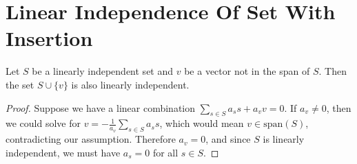 \section{Linear Independence Of Set With Insertion}

\begin{theorem}
  \label{theorem : linear_independent_insert_of_not_in_span}
  \leanok
  Let $S$ be a linearly independent set and $v$ be a vector not in the span of $S$. Then the set $S \cup \{v\}$ is also linearly independent.
\end{theorem}

\begin{proof}
  Suppose we have a linear combination $\sum_{s \in S} a_s s + a_v v = 0$. If $a_v \neq 0$, then we could solve for $v = -\frac{1}{a_v}\sum_{s \in S} a_s s$, which would mean $v \in \text{span}(S)$, contradicting our assumption. Therefore $a_v = 0$, and since $S$ is linearly independent, we must have $a_s = 0$ for all $s \in S$.
\end{proof}